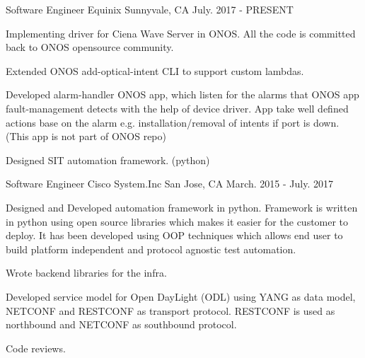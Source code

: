 

\begin{cventries}

  \cventry
    {Software Engineer} %
    {Equinix} %
    {Sunnyvale, CA} %
    {July. 2017 - PRESENT} %
    {
      \begin{cvitems} %
        \item {Implementing driver for Ciena Wave Server in ONOS. All the code
                is committed back to ONOS opensource community.}
        \item {Extended ONOS add-optical-intent CLI to support custom lambdas.}
        \item {Developed alarm-handler ONOS app, which listen for the alarms that ONOS app
                fault-management detects with the help of device driver. App take well defined
                actions base on the alarm e.g. installation/removal of intents if port is down.
                (This app is not part of ONOS repo)}
        \item {Designed SIT automation framework. (python)}
      \end{cvitems}
    }

  \cventry
    {Software Engineer} %
    {Cisco System.Inc} %
    {San Jose, CA} %
    {March. 2015 - July. 2017} %
    {
      \begin{cvitems} %
        \item {Designed and Developed automation framework in python.
                Framework is written in python using open source libraries which makes it easier for the customer to deploy.
                It has been developed using OOP techniques which allows end user to build platform independent and protocol agnostic test automation.}
        \item {Wrote backend libraries for the infra.}
        \item {Developed service model for Open DayLight (ODL) using YANG as data model, NETCONF and RESTCONF as transport protocol.
        		RESTCONF is used as northbound and NETCONF as southbound protocol.}
        \item {Code reviews.}
      \end{cvitems}
    }


\end{cventries}
